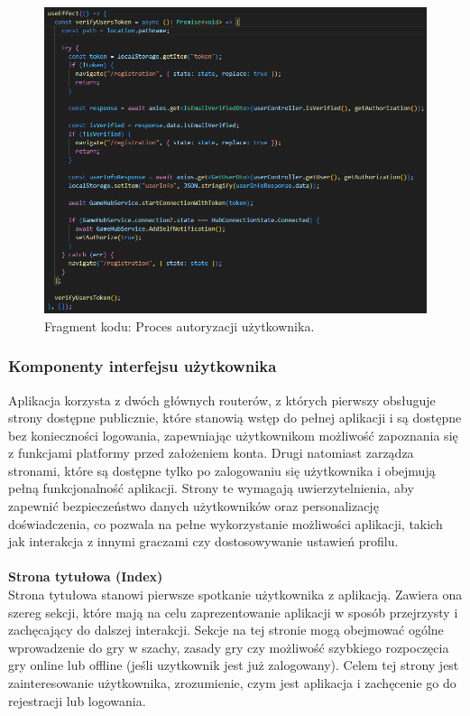 \documentclass[12pt,a4paper]{article}
\begin{document}
\vspace{0.5cm}
\begin{figure}[h!]
    \centering
    \includegraphics[width=1\textwidth]{images/ex_router_authorization.png}
    \caption{Fragment kodu: Proces autoryzacji użytkownika.}
\end{figure}

\newpage

\subsubsection{Komponenty interfejsu użytkownika}

Aplikacja korzysta z dwóch głównych routerów, z których pierwszy obsługuje strony dostępne publicznie, które stanowią wstęp do pełnej aplikacji i są dostępne bez konieczności logowania, zapewniając użytkownikom możliwość zapoznania się z funkcjami platformy przed założeniem konta. Drugi natomiast zarządza stronami, które są dostępne tylko po zalogowaniu się użytkownika i obejmują pełną funkcjonalność aplikacji. Strony te wymagają uwierzytelnienia, aby zapewnić bezpieczeństwo danych użytkowników oraz personalizację doświadczenia, co pozwala na pełne wykorzystanie możliwości aplikacji, takich jak interakcja z innymi graczami czy dostosowywanie ustawień profilu.
\\\\

\noindent \textbf{Strona tytułowa (Index)}\\
Strona tytułowa stanowi pierwsze spotkanie użytkownika z aplikacją. Zawiera ona szereg sekcji, które mają na celu zaprezentowanie aplikacji w sposób przejrzysty i zachęcający do dalszej interakcji. Sekcje na tej stronie mogą obejmować ogólne wprowadzenie do gry w szachy, zasady gry czy możliwość szybkiego rozpoczęcia gry online lub offline (jeśli uzytkownik jest już zalogowany). Celem tej strony jest zainteresowanie użytkownika, zrozumienie, czym jest aplikacja i zachęcenie go do rejestracji lub logowania.
\\
\end{document}
